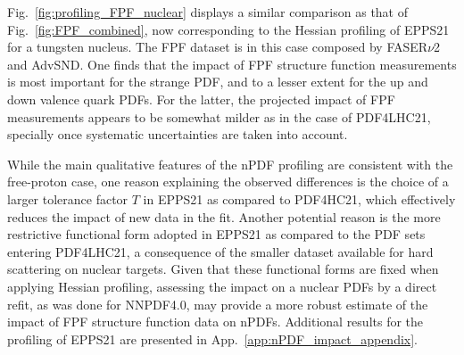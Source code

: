 Fig.~\ref{fig:profiling_FPF_nuclear} displays a similar comparison as that of
 Fig.~\ref{fig:FPF_combined}, now corresponding to the Hessian
 profiling of EPPS21 for a tungsten nucleus.
 The FPF dataset is in this case composed by FASER$\nu$2 and AdvSND.
 One finds that the impact of FPF structure function measurements
 is most important for the strange PDF, and to a lesser extent for the up and down
 valence quark PDFs.
 For the latter, the projected impact of FPF measurements appears to be somewhat milder
 as in the case of PDF4LHC21, specially once systematic uncertainties are taken into account.

 While the main qualitative features of the nPDF profiling are consistent with the free-proton
 case, one reason explaining the observed differences is the choice of a larger tolerance factor $T$ in EPPS21
 as compared to PDF4HC21, which effectively reduces the impact of new data in the fit.
 Another potential reason is the more restrictive functional form adopted in EPPS21 as compared
 to the PDF sets entering PDF4LHC21, a consequence of the smaller dataset available
 for hard scattering on nuclear targets.
 Given that these  functional forms are fixed when applying Hessian profiling,
 assessing the impact on a nuclear PDFs by a direct refit, as was done for NNPDF4.0,
 may provide a more  robust estimate of the impact of FPF structure function data
 on nPDFs.
 Additional results for the profiling of EPPS21 are presented in App.~\ref{app:nPDF_impact_appendix}.

